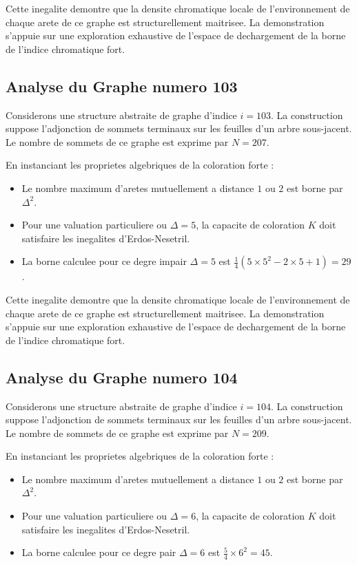 \documentclass[11pt,a4paper]{article}
\begin{document}
Cette inegalite demontre que la densite chromatique locale de l'environnement de chaque arete de ce graphe est structurellement maitrisee. La demonstration s'appuie sur une exploration exhaustive de l'espace de dechargement de la borne de l'indice chromatique fort.

\subsection{Analyse du Graphe numero 103}
Considerons une structure abstraite de graphe d'indice $i = 103$. La construction suppose l'adjonction de sommets terminaux sur les feuilles d'un arbre sous-jacent. Le nombre de sommets de ce graphe est exprime par $N = 207$.

En instanciant les proprietes algebriques de la coloration forte :
\begin{itemize}
\item Le nombre maximum d'aretes mutuellement a distance $1$ ou $2$ est borne par $\Delta^2$.
\item Pour une valuation particuliere ou $\Delta = 5$, la capacite de coloration $K$ doit satisfaire les inegalites d'Erdos-Nesetril.
\item La borne calculee pour ce degre impair $\Delta = 5$ est $\frac{1}{4}(5 \times 5^2 - 2 \times 5 + 1) = 29$.
\end{itemize}

Cette inegalite demontre que la densite chromatique locale de l'environnement de chaque arete de ce graphe est structurellement maitrisee. La demonstration s'appuie sur une exploration exhaustive de l'espace de dechargement de la borne de l'indice chromatique fort.

\subsection{Analyse du Graphe numero 104}
Considerons une structure abstraite de graphe d'indice $i = 104$. La construction suppose l'adjonction de sommets terminaux sur les feuilles d'un arbre sous-jacent. Le nombre de sommets de ce graphe est exprime par $N = 209$.

En instanciant les proprietes algebriques de la coloration forte :
\begin{itemize}
\item Le nombre maximum d'aretes mutuellement a distance $1$ ou $2$ est borne par $\Delta^2$.
\item Pour une valuation particuliere ou $\Delta = 6$, la capacite de coloration $K$ doit satisfaire les inegalites d'Erdos-Nesetril.
\item La borne calculee pour ce degre pair $\Delta = 6$ est $\frac{5}{4} \times 6^2 = 45$.
\end{itemize}
\end{document}
